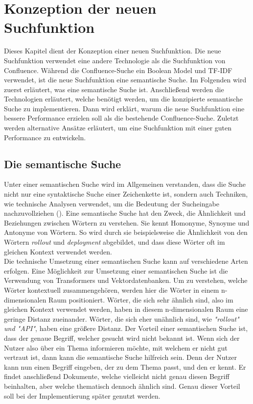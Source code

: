 \chapter{Konzeption der neuen Suchfunktion}
\label{chap:konzeption-der-suchfunktion}
Dieses Kapitel dient der Konzeption einer neuen Suchfunktion.
Die neue Suchfunktion verwendet eine andere Technologie als die Suchfunktion von Confluence.
Während die Confluence-Suche ein Boolean Model und TF-IDF verwendet, ist die neue Suchfunktion eine semantische Suche.
Im Folgenden wird zuerst erläutert, was eine semantische Suche ist.
Anschließend werden die Technologien erläutert, welche benötigt werden, um die konzipierte semantische Suche zu implementieren.
Dann wird erklärt, warum die neue Suchfunktion eine bessere Performance erzielen soll als die bestehende Confluence-Suche.
Zuletzt werden alternative Ansätze erläutert, um eine Suchfunktion mit einer guten Performance zu entwickeln.  

\section{Die semantische Suche}
Unter einer semantischen Suche wird im Allgemeinen verstanden, dass die Suche nicht nur eine syntaktische Suche einer Zeichenkette ist, sondern auch Techniken, wie technische Analysen verwendet, um die Bedeutung der Sucheingabe nachzuvollziehen (\cite{Dengel_2012}).
Eine semantische Suche hat den Zweck, die Ähnlichkeit und Beziehungen zwischen Wörtern zu verstehen.
Sie kennt Homonyme, Synoyme und Antonyme von Wörtern.  
So wird durch sie beispielsweise die Ähnlichkeit von den Wörtern \textit{rollout} und \textit{deployment} abgebildet, und dass diese Wörter oft im gleichen Kontext verwendet werden.\\

Die technische Umsetzung einer semantischen Suche kann auf verschiedene Arten erfolgen.
Eine Möglichkeit zur Umsetzung einer semantischen Suche ist die Verwendung von Transformers und Vektordatenbanken.
Um zu verstehen, welche Wörter kontextuell zusammengehören, werden hier die Wörter in einem n-dimensionalen Raum positioniert.
Wörter, die sich sehr ähnlich sind, also im gleichen Kontext verwendet werden, haben in diesem n-dimensionalen Raum eine geringe Distanz zueinander.
Wörter, die sich eher unähnlich sind, wie \textit{"rollout" und "API"}, haben eine größere Distanz.
Der Vorteil einer semantischen Suche ist, dass der genaue Begriff, welcher gesucht wird nicht bekannt ist.
Wenn sich der Nutzer also über ein Thema informieren möchte, mit welchem er nicht gut vertraut ist, dann kann die semantische Suche hilfreich sein.
Denn der Nutzer kann nun einen Begriff eingeben, der zu dem Thema passt, und den er kennt.
Er findet anschließend Dokumente, welche vielleicht nicht genau diesen Begriff beinhalten, aber welche thematisch dennoch ähnlich sind.
Genau dieser Vorteil soll bei der Implementierung später genutzt werden.\\

